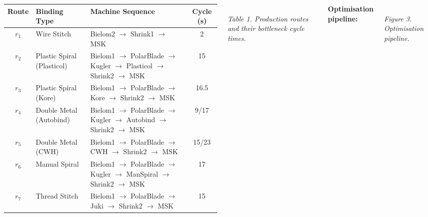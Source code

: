 \documentclass[a0paper,portrait,25pt,margin=12mm,innermargin=12mm,
               blockverticalspace=6mm,colspace=8mm,subcolspace=5mm]{tikzposter}
\begin{document}
\begin{columns}
{    \vspace{3mm}
    \centering
    \small
    \begin{tabularx}{0.95\linewidth}{c l X c}
      \toprule
      \rowcolor{posterNavy!15}
      \textbf{Route} & \textbf{Binding Type} & \textbf{Machine Sequence}
                    & \textbf{Cycle (s)} \\
      \midrule
      $r_1$ & Wire Stitch                 & Bielom2 $\to$ Shrink1 $\to$ MSK                                              & 2     \\
      $r_2$ & Plastic Spiral (Plasticol)  & Bielom1 $\to$ PolarBlade $\to$ Kugler $\to$ Plasticol $\to$ Shrink2 $\to$ MSK & 15    \\
      $r_3$ & Plastic Spiral (Kore)       & Bielom1 $\to$ PolarBlade $\to$ Kore $\to$ Shrink2 $\to$ MSK                  & 16.5  \\
      $r_4$ & Double Metal (Autobind)     & Bielom1 $\to$ PolarBlade $\to$ Kugler $\to$ Autobind $\to$ Shrink2 $\to$ MSK & 9/17  \\
      $r_5$ & Double Metal (CWH)          & Bielom1 $\to$ PolarBlade $\to$ CWH $\to$ Shrink2 $\to$ MSK                   & 15/23 \\
      $r_6$ & Manual Spiral               & Bielom1 $\to$ PolarBlade $\to$ Kugler $\to$ ManSpiral $\to$ Shrink2 $\to$ MSK & 17   \\
      $r_7$ & Thread Stitch               & Bielom1 $\to$ PolarBlade $\to$ Juki $\to$ Shrink2 $\to$ MSK                   & 15   \\
      \bottomrule
    \end{tabularx}\\[2mm]
    \textit{Table 1. Production routes and their bottleneck cycle times.}

    \vspace{6mm}
    \textbf{Optimisation pipeline:}
    \begin{center}
      \\
      \textit{Figure 3. Optimisation pipeline.}
    \end{center}
  }


\end{columns}
\end{document}
